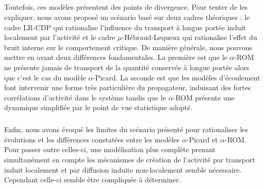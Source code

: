 \subparagraph{}Toutefois, ces modèles présentent des points de divergence. Pour tenter de les expliquer, nous avons proposé un scénario basé sur deux cadres théoriques : le cadre LR-CDP qui rationalise l'influence du transport à longue portée induit localement par l'activité et le cadre $\mu$-Hébraud-Lequeux qui rationalise l'effet du bruit interne sur le comportement critique. De manière générale, nous pouvons mettre en avant deux différences fondamentales. La première est que le $\alpha$-ROM ne présente jamais de transport de la quantité conservée à longue portée alors que c'est le cas du modèle $\alpha$-Picard. La seconde est que les modèles d'écoulement font intervenir une forme très particulière du propagateur, induisant des fortes corrélations d'activité dans le système tandis que le $\alpha$-ROM présente une dynamique simplifiée par le point de vue statistique adopté.

\subparagraph{}Enfin, nous avons évoqué les limites du scénario présenté pour rationaliser les évolutions et les différences constatées entre les modèles $\alpha$-Picard et $\alpha$-ROM. Pour passer outre celles-ci, une modélisation plus complète prenant simultanément en compte les mécanismes de création de l'activité par transport induit localement et par diffusion induite non-localement semble nécessaire. Cependant celle-ci semble être compliquée à déterminer.

